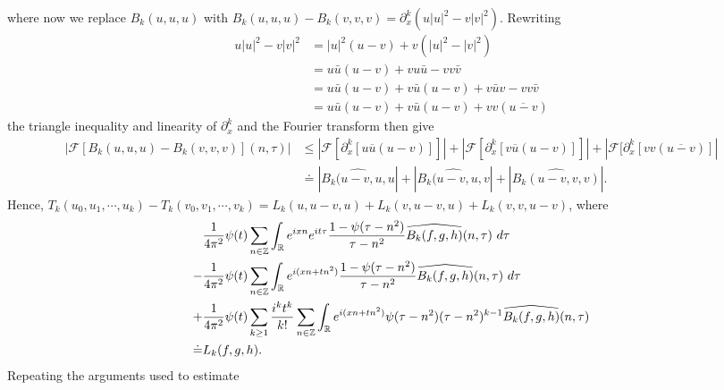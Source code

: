 \documentclass[12pt,reqno]{amsart}
\numberwithin{equation}{section}  %
\numberwithin{figure}{section}
\newcommand{\rr}{\mathbb{R}}
\newcommand{\zz}{\mathbb{Z}}
\newcommand{\wh}{\widehat}
\newcommand{\p}{\partial}
\theoremstyle{plain}
\theoremstyle{definition}
\theoremstyle{remark}
\begin{document}
%
where now we replace $B_k(u,u,u)$ with $B_k(u,u,u) - B_k(v,v,v) = \p_x^k(u | u
|^2 - v | v |^{2})$. Rewriting
%
\begin{equation*}
  \begin{split}
    u | u |^{2} - v | v |^{2}
    & = | u |^2 \left( u -v \right) + v\left( | u 
    |^2 - | v |^2
    \right)
    \\
    & = u \bar u \left( u -v \right) + v u \bar u - v v \bar v
    \\
    & = u \bar u \left( u - v \right) + v \bar u\left( u - v \right) + v 
    \bar u v - v v \bar v
    \\
    & = u \bar u \left( u -v \right) + v \bar u\left( u - v \right) + v v 
    \left( \overline{u -v} \right)
  \end{split}
\end{equation*}
%
the triangle inequality and linearity of $\p_x^k$ and the Fourier transform then give
%
\begin{equation*}
  \begin{split}
    | \mathcal{F}[{B_k}(u,u,u) - B_k(v,v,v)](n, \tau) |
    & \le | \mathcal{F}[\p_x^k[u \overline{u} \left (u -v \right )]] | +
    | \mathcal{F}[\p_x^k[v \overline{u} (u -v)]] | + |\mathcal{F}[\p_x^k[v v 
    (\overline{u-v})]|
    \\
    & \doteq | \wh{{B_k}(u-v, u, u} | + | \wh{{B_k}(u-v, u, v} | + |
    \wh{{B_k}(u-v,v,v)} |.
  \end{split}
\end{equation*}
%
%
Hence, $T_k(u_0, u_1,\cdots,u_k) - T_k(v_0, v_1, \cdots, v_k)
 = L_k(u, u-v,u) + L_k(v,u-v,u) + L_k(v, v, u-v)$, where
\begin{align}
  \label{main-int-exp-mod1}
  & \frac{1}{4 \pi^2} \psi(t) \sum_{n\in \zz} \int_\rr e^{ixn}  
    e^{it \tau} \frac{ 1 - \psi(\tau - n^{2}) 
    }{\tau - n^{2}} \wh{{B_k}(f,g,h)}(n, \tau) \ d \tau
    \\
    \label{main-int-exp-mod2}
    - & \frac{1}{4 \pi^2} \psi(t) \sum_{n\in \zz} \int_\rr e^{i(xn + 
    tn^{2})}
    \frac{1- \psi(\tau - n^{2})}{\tau - n^{2}} \wh{{B_k}(f,g,h)}(n, \tau) \ d \tau
    \\
    \label{main-int-exp-mod3}
    + & \frac{1}{4 \pi^2} \psi(t) \sum_{k \ge 1} \frac{i^k t^k}{k!}
    \sum_{n \in \zz} \int_\rr e^{i(xn + tn^{2} )}
    \psi(\tau - n^{2}) (\tau - n^{2})^{k-1} \wh{{B_k}(f,g,h)}(n, \tau)  
    \\
    \doteq & L_k(f,g,h). \notag
\end{align}
Repeating the arguments used to estimate 
\end{document}
